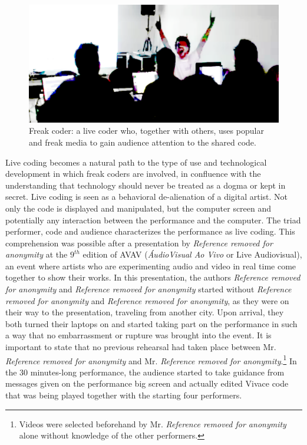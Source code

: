 \documentclass[letterpaper, 12pt]{article}
\begin{document}
\begin{figure}[htpb]
  \begin{center}
    \includegraphics[scale=.4]{img/fig_freakcoder.png}
    \caption{Freak coder: a live coder who, together with others, uses
      popular and freak media to gain audience attention to the shared
      code.}
    \label{fig:freakcoder}
  \end{center}
\end{figure}

Live coding becomes a natural path to the type of use and
technological development in which freak coders are involved, in
confluence with the understanding that technology should never be
treated as a dogma or kept in secret. Live coding is seen as a
behavioral de-alienation of a digital artist. Not only the code is
displayed and manipulated, but the computer screen and potentially any
interaction between the performance and the computer. The triad
performer, code and audience characterizes the performance as live
coding.  This comprehension was possible after a presentation by
\textit{Reference removed for anonymity} at the $9^{th}$ edition of AVAV
(\textit{\'{A}udioVisual Ao Vivo} or Live Audiovisual), an event where
artists who are experimenting audio and video in real time come
together to show their works. In this presentation, the authors
\textit{Reference removed for anonymity} and \textit{Reference removed
  for anonymity} started without \textit{Reference removed for
  anonymity} and \textit{Reference removed for anonymity}, as they
were on their way to the presentation, traveling from another
city. Upon arrival, they both turned their laptops on and started
taking part on the performance in such a way that no embarrassment or
rupture was brought into the event.  It is important to state that no
previous rehearsal had taken place between Mr. \textit{Reference
  removed for anonymity} and Mr. \textit{Reference removed for
  anonymity}.\footnote{Videos were selected beforehand by
  Mr. \textit{Reference removed for anonymity} alone without knowledge
  of the other performers.} In the 30 minutes-long performance, the
audience started to take guidance from messages given on the
performance big screen and actually edited Vivace code that was being
played together with the starting four performers.
\end{document}
